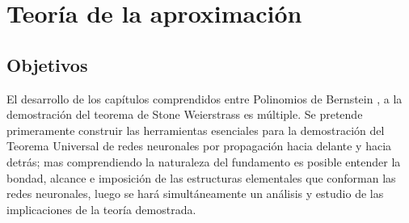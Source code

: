 
\chapter{Teoría de la aproximación}
\section{Objetivos}  

El desarrollo de los capítulos comprendidos entre Polinomios de Bernstein , 
a la demostración del teorema de Stone Weierstrass  es múltiple.
Se pretende primeramente construir las herramientas esenciales para la demostración del 
Teorema Universal de redes neuronales por propagación hacia delante y hacia detrás; 
mas comprendiendo la naturaleza del fundamento es posible entender la bondad, alcance e imposición
de las estructuras elementales que conforman las redes neuronales, luego se hará simultáneamente
un análisis y estudio de las implicaciones de la teoría demostrada. 




